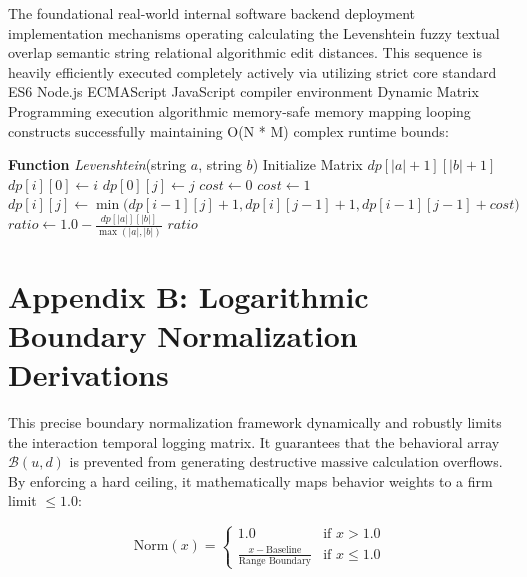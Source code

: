 \documentclass[journal]{IEEEtran}
\begin{document}
The foundational real-world internal software backend deployment implementation mechanisms operating calculating the Levenshtein fuzzy textual overlap semantic string relational algorithmic edit distances. 
This sequence is heavily efficiently executed completely actively via utilizing strict core standard ES6 Node.js ECMAScript JavaScript compiler environment Dynamic Matrix Programming execution algorithmic memory-safe memory mapping looping constructs successfully maintaining O(N * M) complex runtime bounds:

\begin{algorithmic}[1]
\STATE \textbf{Function} \textit{Levenshtein}(string $a$, string $b$)
\STATE Initialize Matrix $dp[|a| + 1][|b| + 1]$
  \STATE $dp[i][0] \leftarrow i$ 
\ENDFOR
{} 
  \STATE $dp[0][j] \leftarrow j$ 
\ENDFOR
{}
            \STATE $cost \leftarrow 0$
        \ELSE
            \STATE $cost \leftarrow 1$
        \ENDIF
        \STATE $dp[i][j] \leftarrow \min \big( dp[i-1][j]+1, dp[i][j-1]+1, dp[i-1][j-1]+cost \big)$
    \ENDFOR
\ENDFOR
\STATE $ratio \leftarrow 1.0 - \frac{dp[|a|][|b|]}{\max(|a|, |b|)}$
\RETURN $ratio$
\end{algorithmic}

\section{Appendix B: Logarithmic Boundary Normalization Derivations}

This precise boundary normalization framework dynamically and robustly limits the interaction temporal logging matrix. It guarantees that the behavioral array $\mathcal{B}(u,d)$ is prevented from generating destructive massive calculation overflows. By enforcing a hard ceiling, it mathematically maps behavior weights to a firm limit $\leq 1.0$:

\begin{equation}
\text{Norm}(x) = 
\begin{cases} 
1.0 & \text{if } x > 1.0 \\
\frac{x - \text{Baseline}}{\text{Range Boundary}} & \text{if } x \leq 1.0 
\end{cases}
\end{equation}
\end{document}
